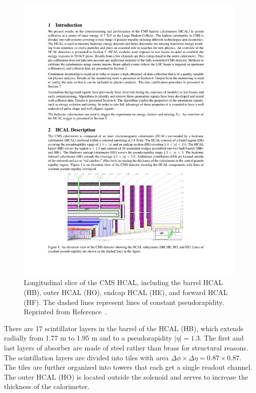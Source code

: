 \begin{figure}[h!]
	\centering
	\includegraphics[width=\linewidth]{Figures/Detector/HCAL_layout.pdf}
       \caption{Longitudinal slice of the CMS HCAL, including the barrel HCAL (HB), outer HCAL (HO), endcap HCAL (HE), and forward HCAL (HF). The dashed lines represent lines of constant pseudorapidity. Reprinted from Reference~\cite{Chatrchyan2008zzk}.}
       \label{fig:HCAL_layout}
\end{figure}

There are 17 scintillator layers in the barrel of the HCAL (HB), which extends radially from 1.77 m to 1.95 m and to a pseudorapidity $|\eta| = 1.3$. The first and last layers of absorber are made of steel rather than brass for structural reasons. The scintillation layers are divided into tiles with area $\Delta\phi \times \Delta\eta = 0.87 \times 0.87$. The tiles are further organized into towers that each get a single readout channel. The outer HCAL (HO) is located outside the solenoid and serves to increase the thickness of the calorimeter. 

